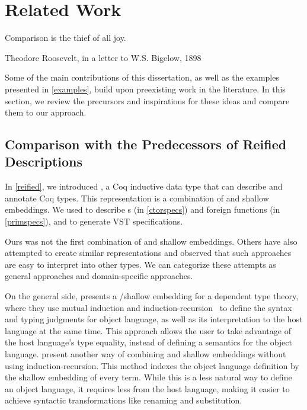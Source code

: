 \chapter{Related Work}
\label{related}

\epigraph{Comparison is the thief of all joy.}{Theodore Roosevelt, in a letter to W.S. Bigelow, 1898}

Some of the main contributions of this dissertation, as well as the examples presented in \autoref{examples}, build upon preexisting work in the literature. In this section, we review the precursors and inspirations for these ideas and compare them to our approach.

\section{Comparison with the Predecessors of Reified Descriptions}

In \autoref{reified}, we introduced \reified{}, a Coq inductive data type that can describe and annotate Coq types. This representation is a combination of  and \gls{shallow embedding}s. We used \reified{} to describe \constructor{}s (in \autoref{ctorspecs}) and \gls{foreign function}s (in \autoref{primspecs}), and to generate VST specifications.

Ours was not the first combination of  and \gls{shallow embedding}s. Others have also attempted to create similar representations and observed that such approaches are easy to interpret into other types. We can categorize these attempts as general approaches and domain-specific approaches.

On the general side,  presents a /\gls{shallow embedding} for a dependent type theory, where they use mutual induction and induction-recursion~\cite{dybjer2000inductionrecursion} to define the syntax and typing judgments for object language, as well as its interpretation to the host language at the same time. This approach allows the user to take advantage of the host language's type equality, instead of defining a semantics for the object language.
 present another way of combining  and \gls{shallow embedding}s without using induction-recursion. This method indexes the object language definition by the shallow embedding of every term. While this is a less natural way to define an object language, it requires less from the host language, making it easier to achieve syntactic transformations like renaming and substitution. 

